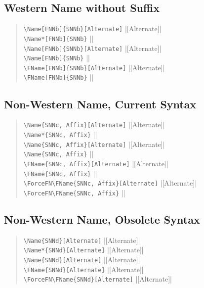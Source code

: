 \documentclass[oneside]{article}
\begin{document}
\subsection{Western Name without Suffix}

\begin{quote}
\Verb+\Name[FNNb]{SNNb}[Alternate]+\dotfill
  |[Alternate]|\\
\Verb+\Name*[FNNb]{SNNb}+\dotfill
  ||\\
\Verb+\Name[FNNb]{SNNb}[Alternate]+\dotfill
  |[Alternate]|\\
\Verb+\Name[FNNb]{SNNb}+\dotfill
  ||\\
\Verb+\FName[FNNb]{SNNb}[Alternate]+\dotfill
  |[Alternate]|\\
\Verb+\FName[FNNb]{SNNb}+\dotfill
  ||
\end{quote}

\subsection{Non-Western Name, Current Syntax}

\begin{quote}
\Verb+\Name{SNNc, Affix}[Alternate]+\dotfill
  |[Alternate]|\\
\Verb+\Name*{SNNc, Affix}+\dotfill
  ||\\
\Verb+\Name{SNNc, Affix}[Alternate]+\dotfill
  |[Alternate]|\\
\Verb+\Name{SNNc, Affix}+\dotfill
  ||\\
\Verb+\FName{SNNc, Affix}[Alternate]+\dotfill
  |[Alternate]|\\
\Verb+\FName{SNNc, Affix}+\dotfill
  ||\\
\Verb+\ForceFN\FName{SNNc, Affix}[Alternate]+\dotfill
  |\ForceFN{}[Alternate]|\\
\Verb+\ForceFN\FName{SNNc, Affix}+\dotfill
  |\ForceFN{}|
\end{quote}

\subsection{Non-Western Name, Obsolete Syntax}

\begin{quote}
\Verb+\Name{SNNd}[Alternate]+\dotfill
  |[Alternate]|\\
\Verb+\Name*{SNNd}[Alternate]+\dotfill
  |[Alternate]|\\
\Verb+\Name{SNNd}[Alternate]+\dotfill
  |[Alternate]|\\
\Verb+\FName{SNNd}[Alternate]+\dotfill
  |[Alternate]|\\
\Verb+\ForceFN\FName{SNNd}[Alternate]+\dotfill
  |\ForceFN{}[Alternate]|
\end{quote}
\end{document}
